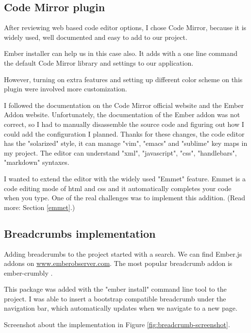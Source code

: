 \documentclass[11pt, a4paper, oneside, openright, medskipamount]{report}
\begin{document}
\subsection{Code Mirror plugin}

After reviewing web based code editor options, I chose Code Mirror, because it is widely used, well documented and easy to add to our project.

Ember installer can help us in this case also. It adds with a one line command the default Code Mirror library and settings to our application.

However, turning on extra features and setting up different color scheme on this plugin were involved more customization.

I followed the documentation on the Code Mirror official website and the Ember Addon website. Unfortunately, the documentation of the Ember addon was not correct, so I had to manually disassemble the source code and figuring out how I could add the configuration I planned. Thanks for these changes, the code editor has the "solarized" style, it can manage "vim", "emacs" and "sublime" key maps in my project. The editor can understand "xml", "javascript", "css", "handlebars", "markdown" syntaxes.

I wanted to extend the editor with the widely used "Emmet" feature. Emmet is a code editing mode of html and css and it automatically completes your code when you type. One of the real challenges was to implement this addition. (Read more: Section \ref{emmet}.)

\subsection{Breadcrumbs implementation} \label{breadcrumbs-implementation}

Adding breadcrumbs to the project started with a search. We can find Ember.js addons on \url{www.emberobserver.com}. The most popular breadcrumb addon is ember-crumbly \cite{ember-crumbly}.

This package was added with the "ember install" command line tool to the project. I was able to insert a bootstrap compatible breadcrumb under the navigation bar, which automatically updates when we navigate to a new page.

Screenshot about the implementation in Figure \ref{fig:breadcrumb-screenshot}.
\end{document}
